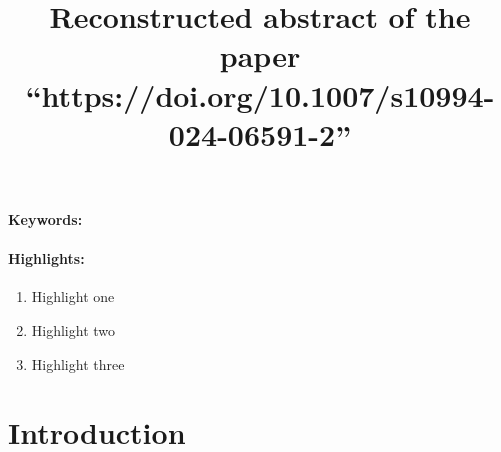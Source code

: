 \documentclass[12pt]{article}
\title{Reconstructed abstract of the paper ``https://doi.org/10.1007/s10994-024-06591-2''}
\date{}
\begin{document}
\maketitle

\begin{abstract}
\end{abstract}
\paragraph{Keywords:} 

\paragraph{Highlights:}
\begin{enumerate}
\item Highlight one
\item Highlight two
\item Highlight three
\end{enumerate}

\section{Introduction}




\end{document}
